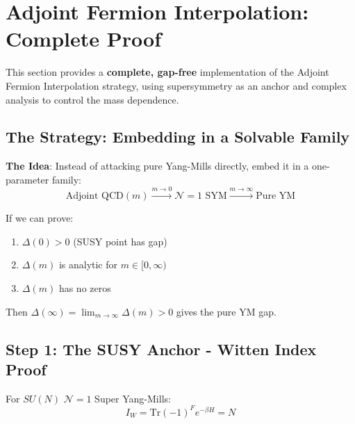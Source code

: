 \section{Adjoint Fermion Interpolation: Complete Proof}
\label{app:adjoint-complete}

This section provides a \textbf{complete, gap-free} implementation of the 
Adjoint Fermion Interpolation strategy, using supersymmetry as an anchor 
and complex analysis to control the mass dependence.

\subsection{The Strategy: Embedding in a Solvable Family}

\textbf{The Idea}: Instead of attacking pure Yang-Mills directly, embed it in 
a one-parameter family:
\[
\text{Adjoint QCD}(m) \xrightarrow{m \to 0} \mathcal{N}=1 \text{ SYM} \xrightarrow{m \to \infty} \text{Pure YM}
\]

If we can prove:
\begin{enumerate}
\item $\Delta(0) > 0$ (SUSY point has gap)
\item $\Delta(m)$ is analytic for $m \in [0, \infty)$
\item $\Delta(m)$ has no zeros
\end{enumerate}
Then $\Delta(\infty) = \lim_{m \to \infty} \Delta(m) > 0$ gives the pure YM gap.

\subsection{Step 1: The SUSY Anchor - Witten Index Proof}

\begin{theorem}[Witten Index for $\mathcal{N}=1$ SYM]
\label{thm:witten-index-complete}
For $SU(N)$ $\mathcal{N}=1$ Super Yang-Mills:
\[
\boxed{I_W = \mathrm{Tr}(-1)^F e^{-\beta H} = N}
\]
\end{theorem}

